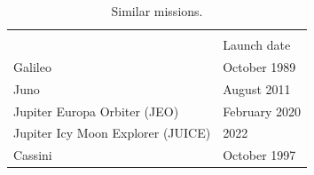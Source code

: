 












\begin{table}[h]
  \caption{Similar missions.}
  \begin{tabular}{p{}p{}}
    & \\
    & Launch date \\
    \hline
    Galileo & October 1989 \\
    Juno & August 2011 \\
    Jupiter Europa Orbiter (JEO) & February 2020 \\
    Jupiter Icy Moon Explorer (JUICE) & 2022 \\
    Cassini & October 1997 \\
  \end{tabular}
\end{table}

